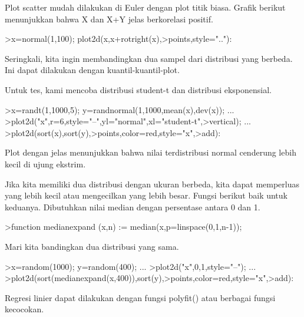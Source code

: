 \documentclass[a4paper,10pt]{article}
\begin{document}
\begin{eulernotebook}
\begin{eulercomment}
Plot scatter mudah dilakukan di Euler dengan plot titik biasa. Grafik
berikut menunjukkan bahwa X dan X+Y jelas berkorelasi positif.
\end{eulercomment}
\begin{eulerprompt}
>x=normal(1,100); plot2d(x,x+rotright(x),>points,style=".."):
\end{eulerprompt}
\begin{eulercomment}
Seringkali, kita ingin membandingkan dua sampel dari distribusi yang
berbeda. Ini dapat dilakukan dengan kuantil-kuantil-plot.

Untuk tes, kami mencoba distribusi student-t dan distribusi
eksponensial.
\end{eulercomment}
\begin{eulerprompt}
>x=randt(1,1000,5); y=randnormal(1,1000,mean(x),dev(x)); ...
>plot2d("x",r=6,style="--",yl="normal",xl="student-t",>vertical); ...
>plot2d(sort(x),sort(y),>points,color=red,style="x",>add):
\end{eulerprompt}
\begin{eulercomment}
Plot dengan jelas menunjukkan bahwa nilai terdistribusi normal
cenderung lebih kecil di ujung ekstrim.

Jika kita memiliki dua distribusi dengan ukuran berbeda, kita dapat
memperluas yang lebih kecil atau mengecilkan yang lebih besar. Fungsi
berikut baik untuk keduanya. Dibutuhkan nilai median dengan persentase
antara 0 dan 1.
\end{eulercomment}
\begin{eulerprompt}
>function medianexpand (x,n) := median(x,p=linspace(0,1,n-1));
\end{eulerprompt}
\begin{eulercomment}
Mari kita bandingkan dua distribusi yang sama.
\end{eulercomment}
\begin{eulerprompt}
>x=random(1000); y=random(400); ...
>plot2d("x",0,1,style="--"); ...
>plot2d(sort(medianexpand(x,400)),sort(y),>points,color=red,style="x",>add):
\end{eulerprompt}
\begin{eulercomment}
Regresi linier dapat dilakukan dengan fungsi polyfit() atau berbagai
fungsi kecocokan.


\end{eulercomment}
\end{eulernotebook}
\end{document}
